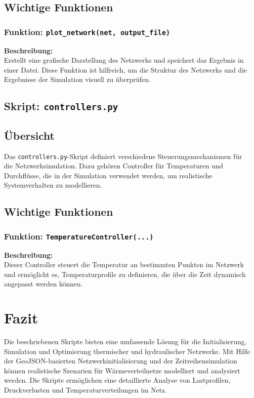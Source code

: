 \subsection{Wichtige Funktionen}

\subsubsection{Funktion: \texttt{plot\_network(net, output\_file)}}
\textbf{Beschreibung:}\\
Erstellt eine grafische Darstellung des Netzwerks und speichert das Ergebnis in einer Datei. Diese Funktion ist hilfreich, um die Struktur des Netzwerks und die Ergebnisse der Simulation visuell zu überprüfen.

\subsection{Skript: \texttt{controllers.py}}

\subsection{Übersicht}
Das \texttt{controllers.py}-Skript definiert verschiedene Steuerungsmechanismen für die Netzwerksimulation. Dazu gehören Controller für Temperaturen und Durchflüsse, die in der Simulation verwendet werden, um realistische Systemverhalten zu modellieren.

\subsection{Wichtige Funktionen}

\subsubsection{Funktion: \texttt{TemperatureController(...)}}
\textbf{Beschreibung:}\\
Dieser Controller steuert die Temperatur an bestimmten Punkten im Netzwerk und ermöglicht es, Temperaturprofile zu definieren, die über die Zeit dynamisch angepasst werden können.

\section{Fazit}

Die beschriebenen Skripte bieten eine umfassende Lösung für die Initialisierung, Simulation und Optimierung thermischer und hydraulischer Netzwerke. Mit Hilfe der GeoJSON-basierten Netzwerkinitialisierung und der Zeitreihensimulation können realistische Szenarien für Wärmeverteilnetze modelliert und analysiert werden. Die Skripte ermöglichen eine detaillierte Analyse von Lastprofilen, Druckverlusten und Temperaturverteilungen im Netz.